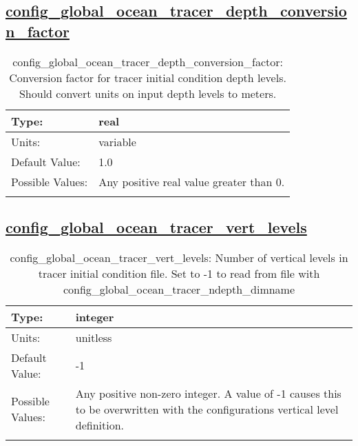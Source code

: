 \subsection[config\_global\_ocean\_tracer\_depth\_conversion\_factor]{\hyperref[sec:nm_tab_global_ocean]{config\_global\_ocean\_tracer\_depth\_conversion\_factor}}
\label{subsec:nm_sec_config_global_ocean_tracer_depth_conversion_factor}
\begin{center}
\begin{longtable}{| p{2.0in} || p{4.0in} |}
    \hline
    Type: & real \\
    \hline
    Units: & \si{variable} \\
    \hline
    Default Value: & 1.0 \\
    \hline
    Possible Values: & Any positive real value greater than 0. \\
    \hline
    \caption{config\_global\_ocean\_tracer\_depth\_conversion\_factor: Conversion factor for tracer initial condition depth levels. Should convert units on input depth levels to meters.}
\end{longtable}
\end{center}
\subsection[config\_global\_ocean\_tracer\_vert\_levels]{\hyperref[sec:nm_tab_global_ocean]{config\_global\_ocean\_tracer\_vert\_levels}}
\label{subsec:nm_sec_config_global_ocean_tracer_vert_levels}
\begin{center}
\begin{longtable}{| p{2.0in} || p{4.0in} |}
    \hline
    Type: & integer \\
    \hline
    Units: & \si{unitless} \\
    \hline
    Default Value: & -1 \\
    \hline
    Possible Values: & Any positive non-zero integer. A value of -1 causes this to be overwritten with the configurations vertical level definition. \\
    \hline
    \caption{config\_global\_ocean\_tracer\_vert\_levels: Number of vertical levels in tracer initial condition file.  Set to -1 to read from file with config\_global\_ocean\_tracer\_ndepth\_dimname}
\end{longtable}
\end{center}
